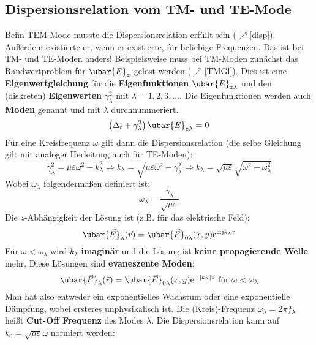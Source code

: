 \subsection{Dispersionsrelation vom TM- und TE-Mode}
Beim TEM-Mode musste die Dispersionsrelation erfüllt sein ($\nearrow$\ref{disp}). Außerdem existierte er, wenn er existierte, für beliebige Frequenzen. Das ist bei TM- und TE-Moden anders! Beispielsweise muss bei TM-Moden zunächst das Randwertproblem für \(\ubar{E}_z\) gelöst werden ($\nearrow$\ref{TMGl}). Dies ist eine \textbf{Eigenwertgleichung} für die \textbf{Eigenfunktionen} \(\ubar{E}_{z\lambda}\) und den (diskreten) \textbf{Eigenwerten} \(\gamma^2_\lambda\) mit \(\lambda = 1,2,3,\ldots\). Die Eigenfunktionen werden auch \textbf{Moden} genannt und mit $\lambda$ durchnummeriert.
	\begin{equation}
		\left(\Delta _t + \gamma_\lambda^2\right) \ubar{E}_{z\lambda} =  0
	\end{equation}
	 Für eine Kreisfrequenz \(\omega\) gilt dann die Dispersionsrelation (die selbe Gleichung gilt mit analoger Herleitung auch für TE-Moden):
	 	\begin{equation}
		\gamma_\lambda^2 = \mu\varepsilon\omega^2- k_\lambda^2 \Rightarrow  k_\lambda=\sqrt{\mu\varepsilon\omega^2-\gamma_\lambda^2} \Rightarrow  \boxed{ k_\lambda=\sqrt{\mu\varepsilon}\sqrt{\omega^2-\omega_\lambda^2}}  
	\end{equation}
	Wobei $\omega_\lambda$ folgendermaßen definiert ist:
	\begin{equation}
		\omega_\lambda=\frac{\gamma_\lambda}{\sqrt{\mu\varepsilon}}
	\end{equation}
 Die \(z\)-Abhängigkeit der Lösung ist (z.B. für das elektrische Feld):
	\begin{equation}
		\ubar{\vec{E}}_\lambda(\vec{r} ) = \ubar{\vec{E}}_{0\lambda}(x,y)  \mathrm{e}^{\pm\mathrm{j} k_\lambda z}
	\end{equation}
 Für \textbf{\(\omega < \omega_\lambda\)} wird \( k_\lambda\) \textbf{imaginär} und die Lösung ist \textbf{keine propagierende Welle} mehr. Diese Lösungen sind \textbf{evaneszente Moden}:
	\begin{equation}
		\ubar{\vec{E}}_\lambda(\vec{r} ) = \ubar{\vec{E}}_{0\lambda}(x,y)  \mathrm{e}^{\mp| k_\lambda| z} \text{ für } \omega < \omega_\lambda
	\end{equation}
 Man hat also entweder ein exponentielles Wachstum oder eine exponentielle Dämpfung, wobei ersteres unphysikalisch ist. Die (Kreis)-Frequenz \(\omega_\lambda = 2\pi f_\lambda\) heißt \textbf{Cut-Off Frequenz} des Modes \(\lambda\). Die  Dispersionsrelation kann auf \( k_0=\sqrt{\mu\varepsilon}\omega\) normiert werden:
